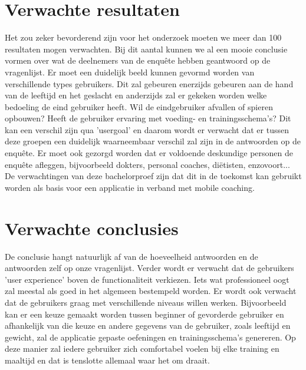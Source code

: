 \section{Verwachte resultaten}
\label{sec:verwachte_resultaten}
Het zou zeker bevorderend zijn voor het onderzoek moeten we meer dan 100 resultaten mogen verwachten. Bij dit aantal kunnen we al een mooie conclusie vormen over wat de deelnemers van de enquête hebben geantwoord op de vragenlijst. \hfill \break \break
Er moet een duidelijk beeld kunnen gevormd worden van verschillende types gebruikers. Dit zal gebeuren enerzijds gebeuren aan de hand van de leeftijd en het geslacht en anderzijds zal er gekeken worden welke bedoeling de eind gebruiker heeft. Wil de eindgebruiker afvallen of spieren opbouwen? Heeft de gebruiker ervaring met voeding- en trainingsschema's? Dit kan een verschil zijn qua 'usergoal' en daarom wordt er verwacht dat er tussen deze groepen een duidelijk waarneembaar verschil zal zijn in de antwoorden op de enquête. Er moet ook gezorgd worden dat er voldoende deskundige personen de enquête afleggen, bijvoorbeeld dokters, personal coaches, diëtisten, enzovoort...\hfill \break \break
De verwachtingen van deze bachelorproef zijn dat dit in de toekomst kan gebruikt worden als basis voor een applicatie in verband met mobile coaching. 

\section{Verwachte conclusies}
\label{sec:verwachte_conclusies}
De conclusie hangt natuurlijk af van de hoeveelheid antwoorden en de antwoorden zelf op onze vragenlijst. Verder wordt er verwacht dat de gebruikers 'user experience' boven de functionaliteit verkiezen. Iets wat professioneel oogt zal meestal als goed in het algemeen bestempeld worden. \hfill \break \break Er wordt ook verwacht dat de gebruikers graag met verschillende niveaus willen werken. Bijvoorbeeld kan er een keuze gemaakt worden tussen beginner of gevorderde gebruiker en afhankelijk van die keuze en andere gegevens van de gebruiker, zoals leeftijd en gewicht, zal de applicatie gepaste oefeningen en trainingsschema's genereren. Op deze manier zal iedere gebruiker zich comfortabel voelen bij elke training en maaltijd en dat is tenslotte allemaal waar het om draait.

